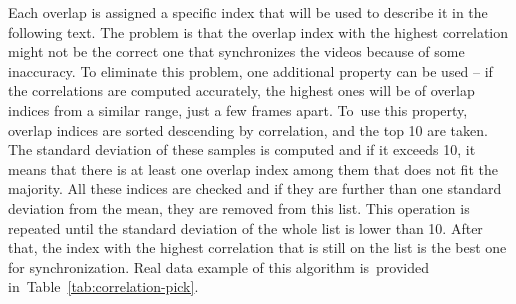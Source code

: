 Each overlap is assigned a specific index that will be used to describe it in the following text. The problem is that the overlap index with the highest correlation might not be the correct one that synchronizes the videos because of some inaccuracy. To eliminate this problem, one additional property can be used -- if the correlations are computed accurately, the highest ones will be of overlap indices from a similar range, just a few frames apart. To~use this property, overlap indices are sorted descending by correlation, and the top 10 are taken. The standard deviation of these samples is computed and if it exceeds 10, it means that there is at least one overlap index among them that does not fit the majority. All these indices are checked and if they are further than one standard deviation from the mean, they are removed from this list. This operation is repeated until the standard deviation of the whole list is lower than 10. After that, the index with the highest correlation that is still on the list is the best one for synchronization. Real data example of this algorithm is~provided in~Table~\ref{tab:correlation-pick}.

